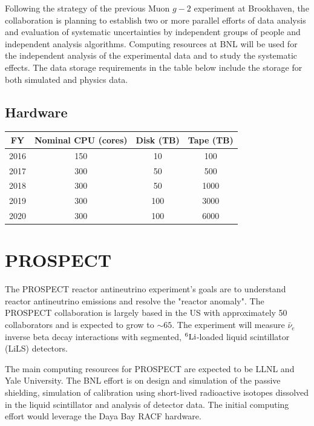 \documentclass[pdftex,12pt,letter]{article}
\begin{document}
\noindent Following the strategy of the previous Muon $g-2$ experiment at Brookhaven, the collaboration is
planning to establish two or more parallel efforts of data analysis and evaluation of systematic uncertainties by
independent groups of people and independent analysis algorithms.  Computing resources at BNL will be used for
the independent analysis of the experimental data and to study the systematic effects. 
The data storage requirements in the table below include the storage for both simulated and physics data. 

\subsection{Hardware}
\begin{table}[tbh]
\centering
\begin{tabular}{|c|c|c|c|}
\hline
FY & Nominal CPU (cores) & Disk (TB) & Tape (TB) \\
\hline
2016 &  150  & 10 & 100 \\
\hline
2017 &  300 & 50  & 500  \\
\hline
2018 &  300 & 50  & 1000 \\
\hline
2019  & 300 & 100 & 3000  \\
\hline
2020 &  300  & 100 & 6000 \\
\hline
\end{tabular}
\end{table}

\pagebreak
\section{PROSPECT}

The PROSPECT reactor antineutrino experiment's goals are to understand
reactor antineutrino emissions and resolve the "reactor anomaly". The
PROSPECT collaboration is largely based in the US with approximately
50 collaborators and is expected to grow to $\sim\!65$. 
The experiment will measure $\bar\nu_e$ inverse beta decay interactions
with segmented, ${}^6{\rm Li}$-loaded liquid scintillator (LiLS)
detectors.

The main computing resources for PROSPECT are expected to be LLNL and
Yale University. The BNL effort is on design and simulation of the passive shielding,
simulation of calibration using short-lived radioactive isotopes
dissolved in the liquid scintillator and analysis of detector
data. The initial computing effort would leverage the Daya Bay RACF
hardware. 
\end{document}

